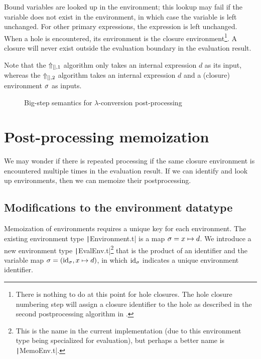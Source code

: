Bound variables are looked up in the environment; this lookup may fail if the variable does not exist in the environment, in which case the variable is left unchanged. For other primary expressions, the expression is left unchanged. When a hole is encountered, its environment is the closure environment\footnote{There is nothing to do at this point for hole closures. The hole closure numbering step will assign a closure identifier to the hole as described in the second postprocessing algorithm in .}. A closure will never exist outside the evaluation boundary in the evaluation result.


Note that the $\Uparrow_{[],1}$ algorithm only takes an internal expression $d$ as its input, whereas the $\Uparrow_{[],2}$ algorithm takes an internal expression $d$ and a (closure) environment $\sigma$ as inputs.


\begin{figure}
  \centering
  \begin{mdframed}
    \begin{singlespace}
      
    \end{singlespace}
  \end{mdframed}
  \caption{Big-step semantics for $\lambda$-conversion post-processing}
  \label{fig:big-step-inside-formal}
\end{figure}

\section{Post-processing memoization}
\label{sec:memoization}

We may wonder if there is repeated processing if the same closure environment is encountered multiple times in the evaluation result. If we can identify and look up environments, then we can memoize their postprocessing.

\subsection{Modifications to the environment datatype}
\label{sec:memoization-evalenv}

Memoization of environments requires a unique key for each environment. The existing environment type \texttt|Environment.t| is a map $\sigma=x\mapsto d$. We introduce a new environment type \texttt|EvalEnv.t|\footnote{This is the name in the current implementation (due to this environment type being specialized for evaluation), but perhaps a better name is \texttt|MemoEnv.t|.} that is the product of an identifier and the variable map $\sigma=(\text{id}_\sigma,x\mapsto d)$, in which $\text{id}_\sigma$ indicates a unique environment identifier.

